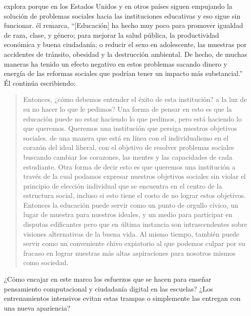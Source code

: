 
\cite{Laba2008} explora porque en los Estados Unidos y en otros países
siguen empujando la solución de problemas sociales hacia las instituciones educativas 
y eso sigue sin funcionar.
él remarca,
``[Educación] ha hecho muy poco para promover igualdad de raza, clase, y género;
para mejorar la salud pública, la productividad económica y buena ciudadanía;
o reducir el sexo en adolescente, las muestras por accidentes de tránsito, obesidad y la destrucción ambiental.
De hecho,
de muchas maneras ha tenido un efecto negativo en estos problemas
sacando dinero y energía de las reformas sociales que podrían tener un impacto más substancial.''
Él continúa escribiendo: 


\begin{quote}

  Entonces, ¿cómo debemos entender el éxito de esta institución?
a la luz de su no hacer lo que le pedimos?
Una forma de pensar en esto es que
la educación puede no estar haciendo lo que pedimos,
pero está haciendo lo que queremos.
Queremos una institución que persiga nuestros objetivos sociales.
de una manera que está en línea con el individualismo en el corazón del ideal liberal,
con el objetivo de resolver problemas sociales
buscando cambiar los corazones, las mentes y las capacidades de cada estudiante.
Otra forma de decir esto es que
queremos una institución a través de la cual podamos expresar nuestros objetivos sociales
sin violar el principio de elección individual
que se encuentra en el centro de la estructura social,
incluso si esto tiene el costo de no lograr estos objetivos.
Entonces la educación puede servir como un punto de orgullo cívico,
un lugar de muestra para nuestros ideales,
y un medio para participar en disputas edificantes pero  que en última instancia son intrascendentes
sobre visiones alternativas de la buena vida.
Al mismo tiempo,
también puede servir como un conveniente chivo expiatorio
al que podemos culpar por su fracaso en lograr nuestras más altas aspiraciones para nosotros mismos como sociedad.


\end{quote}

¿Cómo encajar en este marco los esfuerzos que se hacen para enseñar pensamiento computacional y ciudadanía digital en las escuelas?
¿Los entrenamientos intensivos evitan estas trampas o simplemente las entregan con una nueva apariencia?


